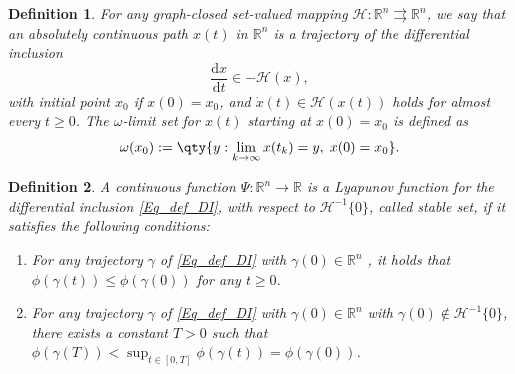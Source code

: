 \documentclass[11pt]{article}
\newcommand{\R}{\mathbb R}
\newcommand{\cH}{\mathcal H}
\newtheorem{definition}{Definition}[section]
\begin{document}
\begin{definition}
For any graph-closed set-valued mapping $\cH: \R^n \rightrightarrows \R^n$,  we say that an absolutely continuous path $x(t)$ in $\R^n$ is a trajectory of the differential inclusion 
\begin{equation}
    \label{Eq_def_DI}
    \frac{\mathrm{d} x}{\mathrm{d}t} \in -\cH(x),
\end{equation}
with initial point $x_0$ if $x(0) = x_0$, and $\dot{x}(t) \in \cH(x(t))$ holds for almost every $t\geq 0$. The $\omega$-limit set for $x(t)$ starting at $x(0)=x_0$ is defined as
\[
\omega(x_0):=\qty{y:\lim_{k\to\infty}x(t_k)=y,\;x(0)=x_0}.
\]
\end{definition}

\begin{definition}
    \label{Defin_Lyapunov_function}
     A continuous function $\Psi:\R^n \to \R$ is a Lyapunov function for the differential inclusion \eqref{Eq_def_DI}, with respect to $\cH^{-1}\{0\}$, called  stable set, if it satisfies the following conditions:
    \begin{enumerate}
        \item For any trajectory $\gamma$ of \eqref{Eq_def_DI} with 
        $\gamma(0) \in \R^n$ , it holds that $\phi(\gamma(t)) \leq \phi(\gamma(0))$ for any $t\geq0$.
        \item For any trajectory $\gamma$ of \eqref{Eq_def_DI} with 
        $\gamma(0) \in \R^n$ with $\gamma(0) \notin \cH^{-1}\{0\}$, there exists a constant $T>0$ such that {$\phi(\gamma(T)) < \sup_{t\in[0,T]}\phi(\gamma(t)) =\phi(\gamma(0))$}.
    \end{enumerate}
\end{definition}
\end{document}
